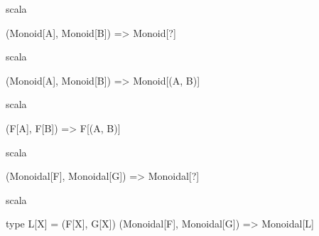 \documentclass{beamer}
\begin{document}
\begin{frame}[fragile]

  \centering
  \large

  \begin{cminted}{scala}

(Monoid[A], Monoid[B]) => Monoid[?]

  \end{cminted}

\end{frame}

\begin{frame}[fragile]

  \centering
  \large

  \begin{cminted}{scala}

(Monoid[A], Monoid[B]) => Monoid[(A, B)]

  \end{cminted}

\end{frame}

%
%
%
%
%
%
%

\begin{frame}[fragile]

  \centering
  \large

  \begin{cminted}{scala}

(F[A], F[B]) => F[(A, B)]

  \end{cminted}

\end{frame}

\begin{frame}[fragile]

  \centering
  \large

  \begin{cminted}{scala}

(Monoidal[F], Monoidal[G]) => Monoidal[?]

  \end{cminted}

\end{frame}

\begin{frame}[fragile]

  \centering
  \large

  \begin{cminted}{scala}

type L[X] = (F[X], G[X])
(Monoidal[F], Monoidal[G]) => Monoidal[L]

  \end{cminted}

\end{frame}
\end{document}
